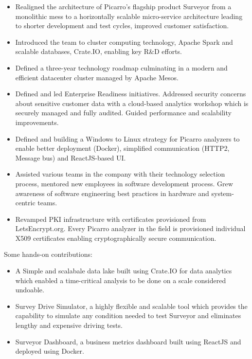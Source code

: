 \documentclass[a4paper, 13pt,line]{article}
\begin{document}
\bigskip
\begin{itemize}
\item Realigned the architecture of Picarro's flagship product
  Surveyor from a monolithic mess to a horizontally scalable
  micro-service architecture leading to shorter development and
  test cycles, improved customer satisfaction.
\item Introduced the team to cluster computing technology, Apache
  Spark and scalable databases, Crate.IO, enabling key R\&D
  efforts.
\item Defined a three-year technology roadmap culminating in a modern
  and efficient datacenter cluster managed by Apache Mesos.
\item Defined and led Enterprise Readiness initiatives. Addressed
  security concerns about sensitive customer data with a cloud-based
  analytics workshop which is securely managed and fully
  audited. Guided performance and scalability improvements.
\item Defined and building a Windows to Linux strategy for Picarro
  analyzers to enable better deployment (Docker), simplified
  communication (HTTP2, Message bus) and ReactJS-based UI.
\item Assisted various teams in the company with their technology
  selection process, mentored new employees in software development
  process. Grew awareness of software engineering best practices in
  hardware and system-centric teams.
\item Revamped PKI infrastructure with certificates provisioned from
  LetsEncrypt.org. Every Picarro analyzer in the field is provisioned
  individual X509 certificates enabling cryptographically secure
  communication.
\end{itemize}

\bigskip\noindent Some hands-on contributions:
\begin{itemize}
\item A Simple and scalabale data lake built using Crate.IO for data
  analytics which enabled a time-critical analysis to be done on a
  scale considered undoable.
\item Survey Drive Simulator, a highly flexible and scalable tool
  which provides the capability to simulate any condition needed to
  test Surveyor and eliminates lengthy and expensive driving tests.
\item Surveyor Dashboard, a business metrics dashboard built using
  ReactJS and deployed using Docker.
\end{itemize}
\end{document}
